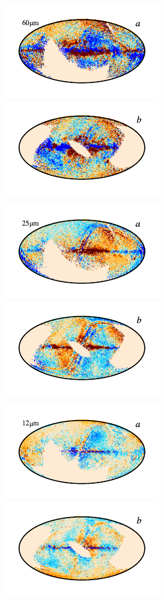 \documentclass{aa}
\begin{document}
\begin{figure}
	\includegraphics{figs/res_maps/res_07a_c0001_000022.pdf}\includegraphics{figs/res_maps/res_07b_c0001_000022.pdf}
  \vspace*{-0.85cm}

	\includegraphics{figs/res_maps/res_06a_c0001_000022.pdf}\includegraphics{figs/res_maps/res_06b_c0001_000022.pdf}
  \vspace*{-0.85cm}

	\includegraphics{figs/res_maps/res_05a_c0001_000022.pdf}\includegraphics{figs/res_maps/res_05b_c0001_000022.pdf}
  \vspace*{-0.85cm}
  

\end{figure}
\end{document}
